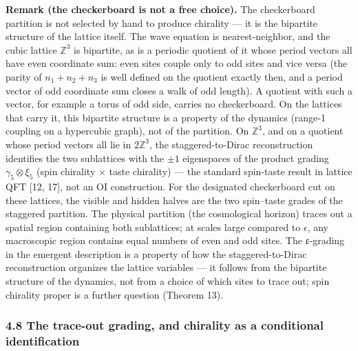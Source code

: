\documentclass[
]{article}
\begin{document}
\textbf{Remark (the checkerboard is not a free choice).} The
checkerboard partition is not selected by hand to produce chirality ---
it is the bipartite structure of the lattice itself. The wave equation
is nearest-neighbor, and the cubic lattice \(\mathbb Z^3\) is bipartite,
as is a periodic quotient of it whose period vectors all have even
coordinate sum: even sites couple only to odd sites and vice versa (the
parity of \(n_1+n_2+n_3\) is well defined on the quotient exactly then,
and a period vector of odd coordinate sum closes a walk of odd length).
A quotient with such a vector, for example a torus of odd side, carries
no checkerboard. On the lattices that carry it, this bipartite structure
is a property of the dynamics (range-1 coupling on a hypercubic graph),
not of the partition. On \(\mathbb Z^3\), and on a quotient whose period
vectors all lie in \(2\mathbb Z^3\), the staggered-to-Dirac
reconstruction identifies the two sublattices with the \(\pm 1\)
eigenspaces of the product grading \(\gamma_5 \otimes \xi_5\) (spin
chirality × taste chirality) --- the standard spin-taste result in
lattice QFT {[}12, 17{]}, not an OI construction. For the designated
checkerboard cut on these lattices, the visible and hidden halves are
the two spin--taste grades of the staggered partition. The physical
partition (the cosmological horizon) traces out a spatial region
containing both sublattices; at scales large compared to \(\epsilon\),
any macroscopic region contains equal numbers of even and odd sites. The
ε-grading in the emergent description is a property of how the
staggered-to-Dirac reconstruction organizes the lattice variables --- it
follows from the bipartite structure of the dynamics, not from a choice
of which sites to trace out; spin chirality proper is a further question
(Theorem 13).

\hypertarget{the-trace-out-grading-and-chirality-as-a-conditional-identification}{%
\subsubsection{4.8 The trace-out grading, and chirality as a conditional
identification}\label{the-trace-out-grading-and-chirality-as-a-conditional-identification}}
\end{document}
